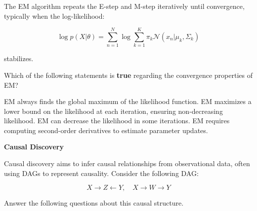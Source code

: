 \documentclass[12pt,letterpaper, onecolumn]{exam}
\begin{document}
\begin{questions}
\begin{parts}
    The EM algorithm repeats the E-step and M-step iteratively until convergence, typically when the log-likelihood:

    \[
    \log p(X | \theta) = \sum_{n=1}^{N} \log \sum_{k=1}^{K} \pi_k \mathcal{N}(x_n | \mu_k, \Sigma_k)
    \]

    stabilizes.

    Which of the following statements is \textbf{true} regarding the convergence properties of EM?

    \begin{choices}
        \choice EM always finds the global maximum of the likelihood function.
        \choice EM maximizes a lower bound on the likelihood at each iteration, ensuring non-decreasing likelihood.
        \choice EM can decrease the likelihood in some iterations.
        \choice EM requires computing second-order derivatives to estimate parameter updates.
    \end{choices}
    
\end{parts}

\begin{solution}
    \begin{parts}
        \part
        \part
        \part
        \part
    \end{parts}
\end{solution}


\question[20 points] \textbf{Causal Discovery}\droppoints


Causal discovery aims to infer causal relationships from observational data, often using DAGs to represent causality. Consider the following DAG:

\[
X \rightarrow Z \leftarrow Y, \quad X \rightarrow W \rightarrow Y
\]

Answer the following questions about this causal structure.

\begin{parts}

\end{parts}
\end{questions}
\end{document}
